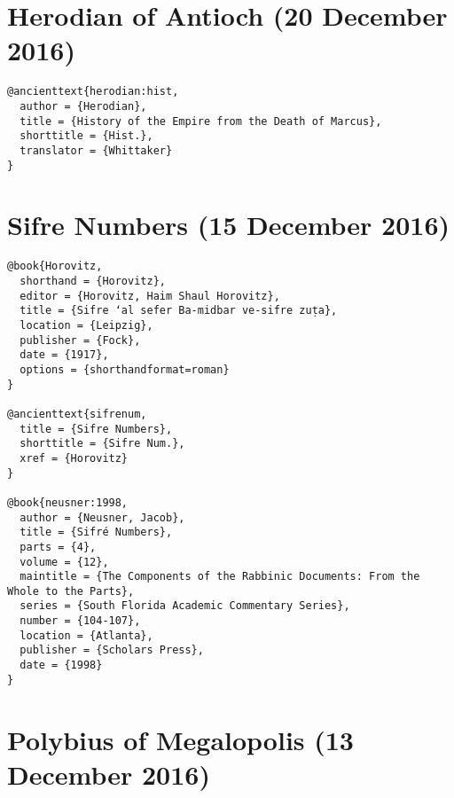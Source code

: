 \documentclass[a4paper]{article}
\begin{document}
\section{Herodian of Antioch (20 December 2016)}

\begin{verbatim}
@ancienttext{herodian:hist,
  author = {Herodian},
  title = {History of the Empire from the Death of Marcus},
  shorttitle = {Hist.},
  translator = {Whittaker}
}
\end{verbatim}

\exampleancientsources
{}

\section{Sifre Numbers (15 December 2016)}

\begin{verbatim}
@book{Horovitz,
  shorthand = {Horovitz},
  editor = {Horovitz, Haim Shaul Horovitz},
  title = {Sifre ʻal sefer Ba-midbar ve-sifre zuṭa},
  location = {Leipzig},
  publisher = {Fock},
  date = {1917},
  options = {shorthandformat=roman}
}

@ancienttext{sifrenum,
  title = {Sifre Numbers},
  shorttitle = {Sifre Num.},
  xref = {Horovitz}
}

@book{neusner:1998,
  author = {Neusner, Jacob},
  title = {Sifré Numbers},
  parts = {4},
  volume = {12},
  maintitle = {The Components of the Rabbinic Documents: From the Whole to the Parts},
  series = {South Florida Academic Commentary Series},
  number = {104-107},
  location = {Atlanta},
  publisher = {Scholars Press},
  date = {1998}
}
\end{verbatim}

\begin{verbcite}
  \nocite{neusner:1998}
\end{verbcite}
\exampleancientsources
\examplesecondarysources
\examplebibliography
{}

\section{Polybius of Megalopolis (13 December 2016)}
\end{document}
